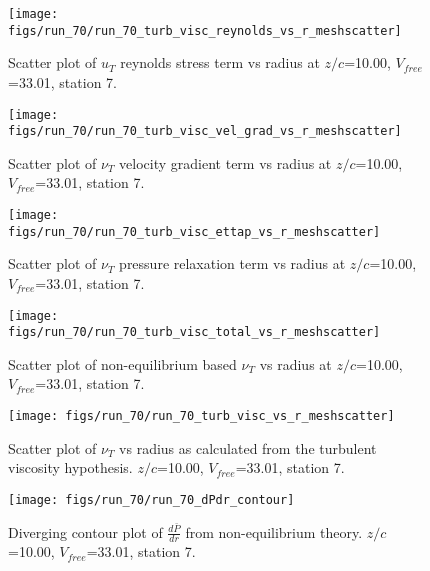 \begin{figure}[H]
\centering
\texttt{[image: figs/run\_70/run\_70\_turb\_visc\_reynolds\_vs\_r\_meshscatter]}
\caption{Scatter plot of $
u_T$ reynolds stress term vs radius at $z/c$=10.00, $V_{free}$=33.01, station 7.}
\end{figure}


\begin{figure}[H]
\centering
\texttt{[image: figs/run\_70/run\_70\_turb\_visc\_vel\_grad\_vs\_r\_meshscatter]}
\caption{Scatter plot of $\nu_T$ velocity gradient term vs radius at $z/c$=10.00, $V_{free}$=33.01, station 7.}
\end{figure}


\begin{figure}[H]
\centering
\texttt{[image: figs/run\_70/run\_70\_turb\_visc\_ettap\_vs\_r\_meshscatter]}
\caption{Scatter plot of $\nu_T$ pressure relaxation term vs radius at $z/c$=10.00, $V_{free}$=33.01, station 7.}
\end{figure}


\begin{figure}[H]
\centering
\texttt{[image: figs/run\_70/run\_70\_turb\_visc\_total\_vs\_r\_meshscatter]}
\caption{Scatter plot of non-equilibrium based $\nu_T$ vs radius at $z/c$=10.00, $V_{free}$=33.01, station 7.}
\end{figure}


\begin{figure}[H]
\centering
\texttt{[image: figs/run\_70/run\_70\_turb\_visc\_vs\_r\_meshscatter]}
\caption{Scatter plot of $\nu_T$ vs radius as calculated from the turbulent viscosity hypothesis. $z/c$=10.00, $V_{free}$=33.01, station 7.}
\end{figure}


\begin{figure}[H]
\centering
\texttt{[image: figs/run\_70/run\_70\_dPdr\_contour]}
\caption{Diverging contour plot of $\frac{d\bar{P}}{dr}$ from non-equilibrium theory. $z/c$=10.00, $V_{free}$=33.01, station 7.}
\end{figure}


